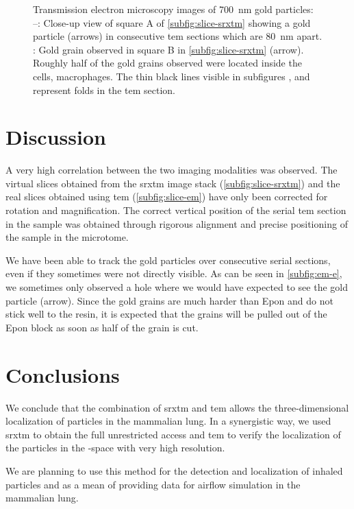 \begin{figure}[htb]
{		\label{subfig:em-f}%
		}%
	\caption[\acs{tem} images of gold particles]{Transmission electron microscopy images of \SI{700}{\nano\meter} gold particles: --: Close-up view of square A of \autoref{subfig:slice-srxtm} showing a gold particle (arrows) in consecutive \ac{tem} sections which are \SI{80}{\nano\meter} apart. : Gold grain observed in square B in \autoref{subfig:slice-srxtm} (arrow). Roughly half of the gold grains observed were located inside the cells, \eg macrophages. The thin black lines visible in subfigures ,  and  represent folds in the \ac{tem} section.}%
	\label{fig:srxtm-em}%
\end{figure}

\section{Discussion}
A very high correlation between the two imaging modalities was observed. The virtual slices obtained from the \ac{srxtm} image stack (\autoref{subfig:slice-srxtm}) and the real slices obtained using \ac{tem} (\autoref{subfig:slice-em}) have only been corrected for rotation and magnification. The correct vertical position of the serial \ac{tem} section in the sample was obtained through rigorous alignment and precise positioning of the sample in the microtome.

We have been able to track the gold particles over consecutive serial sections, even if they sometimes were not directly visible. As can be seen in \autoref{subfig:em-e}, we sometimes only observed a hole where we would have expected to see the gold particle (arrow). Since the gold grains are much harder than Epon and do not stick well to the resin, it is expected that the grains will be pulled out of the Epon block as soon as half of the grain is cut.

\section{Conclusions}
We conclude that the combination of \ac{srxtm} and \ac{tem} allows the three-dimensional localization of particles in the mammalian lung. In a synergistic way, we used \ac{srxtm} to obtain the full unrestricted \threed access and \ac{tem} to verify the localization of the particles in the \threed-space with very high resolution. 

We are planning to use this method for the detection and localization of inhaled particles and as a mean of providing data for airflow simulation in the mammalian lung.

